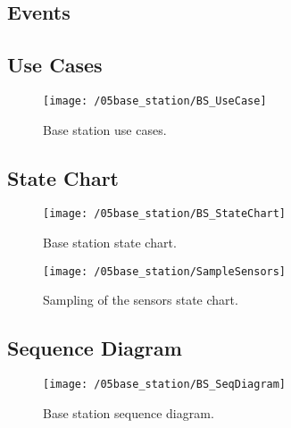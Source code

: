 \subsection{Events}

\begin{table}[h]
	\centering
	
	\caption{Base station events.}
	\label{table:data}
\end{table}


\subsection{Use Cases}

\begin{figure}[ht]
	\centering
	\texttt{[image: /05base\_station/BS\_UseCase]}
	\caption{Base station use cases.}
	\label{fig:bs_use_cases}
\end{figure}

\subsection{State Chart}

\begin{figure}[ht]
	\centering
	\texttt{[image: /05base\_station/BS\_StateChart]}
	\caption{Base station state chart.}
	\label{fig:bs_state_chart}
\end{figure}

\begin{figure}[ht]
	\centering
	\texttt{[image: /05base\_station/SampleSensors]}
	\caption{Sampling of the sensors state chart.}
	\label{fig:sample_sensors}
\end{figure}

\subsection{Sequence Diagram}

\begin{figure}[ht]
	\centering
	\texttt{[image: /05base\_station/BS\_SeqDiagram]}
	\caption{Base station sequence diagram.}
	\label{fig:bs_seq_diagram}
\end{figure}